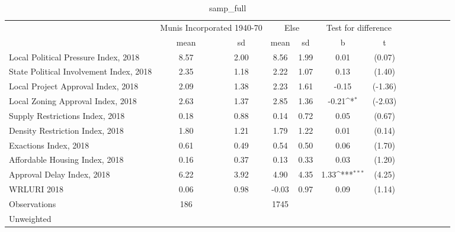 \begin{table}[htbp]\centering
\def\sym#1{\ifmmode^{#1}\else\(^{#1}\)\fi}
\caption{samp\_full \label{tab1}}
\begin{tabular}{l*{3}{cccc}}
\toprule
                    &\multicolumn{2}{c}{Munis Incorporated 1940-70}&\multicolumn{2}{c}{Else} &\multicolumn{2}{c}{Test for difference}\\
                    &        mean&          sd&        mean&          sd&           b         &           t\\
\midrule
Local Political Pressure Index, 2018&        8.57&        2.00&        8.56&        1.99&        0.01         &      (0.07)\\
State Political Involvement Index, 2018&        2.35&        1.18&        2.22&        1.07&        0.13         &      (1.40)\\
Local Project Approval Index, 2018&        2.09&        1.38&        2.23&        1.61&       -0.15         &     (-1.36)\\
Local Zoning Approval Index, 2018&        2.63&        1.37&        2.85&        1.36&       -0.21\sym{*}  &     (-2.03)\\
Supply Restrictions Index, 2018&        0.18&        0.88&        0.14&        0.72&        0.05         &      (0.67)\\
Density Restriction Index, 2018&        1.80&        1.21&        1.79&        1.22&        0.01         &      (0.14)\\
Exactions Index, 2018&        0.61&        0.49&        0.54&        0.50&        0.06         &      (1.70)\\
Affordable Housing Index, 2018&        0.16&        0.37&        0.13&        0.33&        0.03         &      (1.20)\\
Approval Delay Index, 2018&        6.22&        3.92&        4.90&        4.35&        1.33\sym{***}&      (4.25)\\
WRLURI 2018         &        0.06&        0.98&       -0.03&        0.97&        0.09         &      (1.14)\\
\midrule
Observations        &         186&            &        1745&            &                     &            \\
\bottomrule
\multicolumn{7}{l}{\footnotesize Unweighted}\\
\end{tabular}
\end{table}
